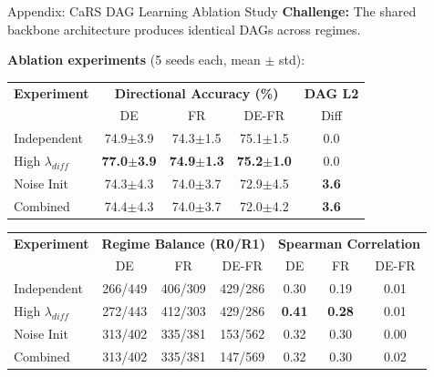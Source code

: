 \documentclass[aspectratio=169]{beamer}
\begin{document}
\begin{frame}{Appendix: CaRS DAG Learning Ablation Study}
\textbf{Challenge:} The shared backbone architecture produces identical DAGs across regimes.

\textbf{Ablation experiments} (5 seeds each, mean $\pm$ std):

\begin{table}
\centering
\scriptsize
\begin{tabular}{l|ccc|c}
\toprule
\textbf{Experiment} & \multicolumn{3}{c|}{\textbf{Directional Accuracy (\%)}} & \textbf{DAG L2} \\
 & DE & FR & DE-FR & Diff \\
\midrule
Independent & 74.9$\pm$3.9 & 74.3$\pm$1.5 & 75.1$\pm$1.5 & 0.0 \\
High $\lambda_{diff}$ & \textbf{77.0$\pm$3.9} & \textbf{74.9$\pm$1.3} & \textbf{75.2$\pm$1.0} & 0.0 \\
Noise Init & 74.3$\pm$4.3 & 74.0$\pm$3.7 & 72.9$\pm$4.5 & \textbf{3.6} \\
Combined & 74.4$\pm$4.3 & 74.0$\pm$3.7 & 72.0$\pm$4.2 & \textbf{3.6} \\
\bottomrule
\end{tabular}
\end{table}

\begin{table}
\centering
\scriptsize
\begin{tabular}{l|ccc|ccc}
\toprule
\textbf{Experiment} & \multicolumn{3}{c|}{\textbf{Regime Balance (R0/R1)}} & \multicolumn{3}{c}{\textbf{Spearman Correlation}} \\
 & DE & FR & DE-FR & DE & FR & DE-FR \\
\midrule
Independent & 266/449 & 406/309 & 429/286 & 0.30 & 0.19 & 0.01 \\
High $\lambda_{diff}$ & 272/443 & 412/303 & 429/286 & \textbf{0.41} & \textbf{0.28} & 0.01 \\
Noise Init & 313/402 & 335/381 & 153/562 & 0.32 & 0.30 & 0.00 \\
Combined & 313/402 & 335/381 & 147/569 & 0.32 & 0.30 & 0.02 \\
\bottomrule
\end{tabular}
\end{table}
\end{frame}
\end{document}
